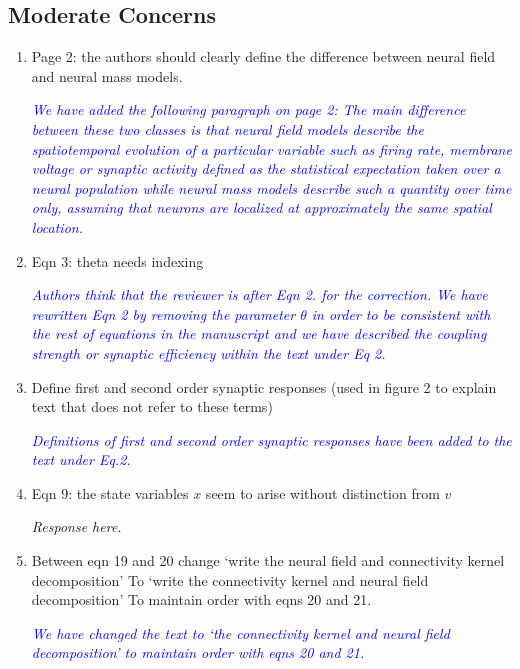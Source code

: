\documentclass{article}
\newcommand{\parham}[1]{\textcolor{blue}{#1}}
\begin{document}
			\subsection{Moderate Concerns} 
			\begin{enumerate} 
			 \item Page 2: the authors should clearly define the difference between neural field and neural mass models.
			
			\emph{\parham{We have added the following paragraph on page 2: The main difference between these two classes is that neural field models describe the spatiotemporal evolution of a particular variable such as firing rate, membrane voltage or synaptic activity defined as the statistical expectation taken over a neural population while neural mass models describe such a quantity over time only, assuming that neurons are localized at approximately the same spatial location.}}
			
			\item Eqn 3: theta needs indexing 
 
			\emph{\parham{Authors think that the reviewer is after Eqn 2. for the correction.  We have rewritten Eqn 2 by removing the parameter $\theta$ in order to be consistent with the rest of equations in the manuscript and we have described the coupling strength or synaptic efficiency within the text under Eq 2.}}
 			
			\item Define first and second order synaptic responses (used in figure 2 to explain text that does not refer to these terms)
			
			\emph{\parham{Definitions of first and second order synaptic responses have been added to the text under Eq.2.}}
			
			\item{Eqn 9: the state variables $x$ seem to arise without distinction from $v$}  
			
			\emph{Response here.}
			
			\item Between eqn 19 and 20 change
			`write the neural field and connectivity kernel decomposition' To `write the connectivity kernel and neural field decomposition'
			To maintain order with eqns 20 and 21.

			\emph{\parham{We have changed the text to `the connectivity kernel and neural field decomposition' to maintain order with eqns 20 and 21.}}
			
			 
			 \end{enumerate}  
\end{document}
